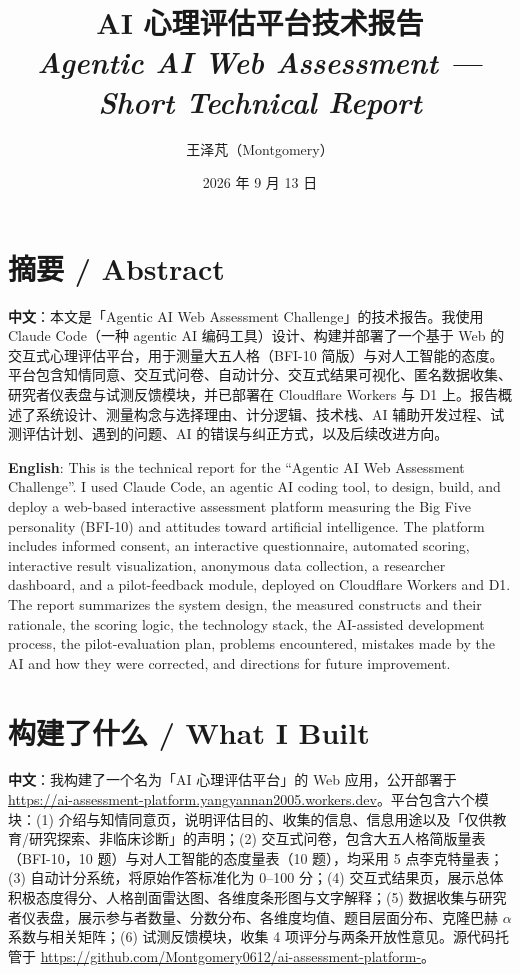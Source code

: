 \documentclass[11pt,a4paper]{ctexart}
\title{\bfseries AI 心理评估平台技术报告\\[0.4em]
\large\mdseries\textit{Agentic AI Web Assessment --- Short Technical Report}}
\author{王泽芃（Montgomery）}
\date{2026 年 9 月 13 日}
\begin{document}
\maketitle

\section*{摘要 / Abstract}

\noindent\textbf{中文}：本文是「Agentic AI Web Assessment Challenge」的技术报告。我使用 Claude Code（一种 agentic AI 编码工具）设计、构建并部署了一个基于 Web 的交互式心理评估平台，用于测量大五人格（BFI-10 简版）与对人工智能的态度。平台包含知情同意、交互式问卷、自动计分、交互式结果可视化、匿名数据收集、研究者仪表盘与试测反馈模块，并已部署在 Cloudflare Workers 与 D1 上。报告概述了系统设计、测量构念与选择理由、计分逻辑、技术栈、AI 辅助开发过程、试测评估计划、遇到的问题、AI 的错误与纠正方式，以及后续改进方向。

\medskip

\noindent\textbf{English}: This is the technical report for the ``Agentic AI Web Assessment Challenge''. I used Claude Code, an agentic AI coding tool, to design, build, and deploy a web-based interactive assessment platform measuring the Big Five personality (BFI-10) and attitudes toward artificial intelligence. The platform includes informed consent, an interactive questionnaire, automated scoring, interactive result visualization, anonymous data collection, a researcher dashboard, and a pilot-feedback module, deployed on Cloudflare Workers and D1. The report summarizes the system design, the measured constructs and their rationale, the scoring logic, the technology stack, the AI-assisted development process, the pilot-evaluation plan, problems encountered, mistakes made by the AI and how they were corrected, and directions for future improvement.

\section{构建了什么 / What I Built}

\noindent\textbf{中文}：我构建了一个名为「AI 心理评估平台」的 Web 应用，公开部署于 \url{https://ai-assessment-platform.yangyannan2005.workers.dev}。平台包含六个模块：(1) 介绍与知情同意页，说明评估目的、收集的信息、信息用途以及「仅供教育/研究探索、非临床诊断」的声明；(2) 交互式问卷，包含大五人格简版量表（BFI-10，10 题）与对人工智能的态度量表（10 题），均采用 5 点李克特量表；(3) 自动计分系统，将原始作答标准化为 0--100 分；(4) 交互式结果页，展示总体积极态度得分、人格剖面雷达图、各维度条形图与文字解释；(5) 数据收集与研究者仪表盘，展示参与者数量、分数分布、各维度均值、题目层面分布、克隆巴赫 $\alpha$ 系数与相关矩阵；(6) 试测反馈模块，收集 4 项评分与两条开放性意见。源代码托管于 \url{https://github.com/Montgomery0612/ai-assessment-platform-}。
\end{document}
